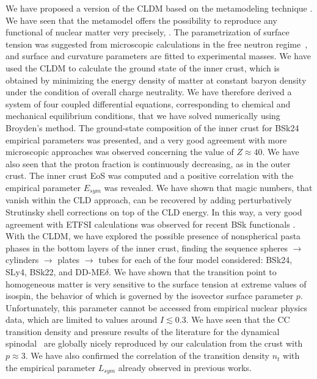 We have proposed a version of the CLDM based on the metamodeling
technique \cite{Margueron2018a,Margueron2018b}. We have seen that the
metamodel offers the possibility to reproduce any functional of nuclear matter 
very precisely, . The parametrization of 
surface tension was suggested from
microscopic calculations in the free neutron regime~\cite{Ravenhall1983}, and
surface and curvature parameters are fitted to experimental masses. We have used 
the CLDM to calculate the ground state of the inner crust, which is obtained by
minimizing the energy density of matter at constant baryon density under the
condition of overall charge neutrality. We have therefore derived a system of
four coupled differential equations, corresponding to chemical and mechanical
equilibrium conditions, that we have solved numerically using Broyden's method.
The ground-state composition of the inner crust for BSk24 empirical parameters 
was presented, and a very good agreement with more microscopic approaches was 
observed concerning the value of $Z \approx 40$. We have also seen that the 
proton fraction is continuously decreasing, as in the outer crust. The inner
crust EoS was computed and a positive correlation with the empirical 
parameter $E_{sym}$ was revealed. We have shown that magic numbers, that vanish
within the CLD approach, can be recovered by adding perturbatively Strutinsky
shell corrections on top of the CLD energy. In this way, a very good agreement 
with ETFSI calculations was observed for recent BSk 
functionals \cite{Pearson2018}. With the CLDM, we have explored the possible 
presence of nonspherical pasta phases in the bottom layers of the inner crust,
finding the sequence spheres $\rightarrow$ cylinders $\rightarrow$ plates
$\rightarrow$ tubes for each of the four model considered: BSk24, SLy4, BSk22,
and DD-ME$\delta$. We have shown that the transition point to homogeneous
matter is very sensitive to the surface tension at extreme values of isospin, 
the behavior of which is governed by the isovector surface parameter $p$.
Unfortunately, this parameter cannot be accessed from empirical nuclear physics 
data, which are limited to values around $I \lesssim 0.3$. We have seen that 
the CC transition density and pressure results of the literature for the 
dynamical spinodal~\cite{Ducoin2011} are globally nicely reproduced by our 
calculation from the crust with $p \approx 3$. We have also confirmed
the correlation of the transition density $n_t$ with the empirical parameter
$L_{sym}$ already observed in previous works.

